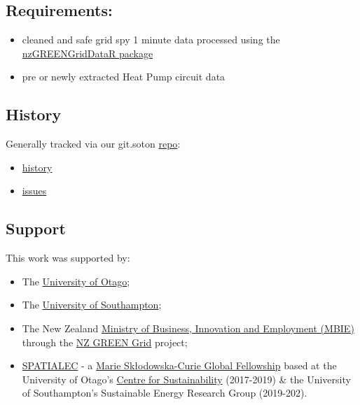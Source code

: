 \documentclass[]{article}
\providecommand{\tightlist}{%
  \setlength{\itemsep}{0pt}\setlength{\parskip}{0pt}}
\begin{document}
\subsection{Requirements:}\label{requirements}

\begin{itemize}
\tightlist
\item
  cleaned and safe grid spy 1 minute data processed using the
  \href{https://github.com/dataknut/nzGREENGridDataR/tree/master/dataProcessing/gridSpy}{nzGREENGridDataR
  package}
\item
  pre or newly extracted Heat Pump circuit data
\end{itemize}

\subsection{History}\label{history}

Generally tracked via our git.soton
\href{https://git.soton.ac.uk/ba1e12/nzGREENGrid}{repo}:

\begin{itemize}
\tightlist
\item
  \href{https://git.soton.ac.uk/ba1e12/nzGREENGrid/tree/master/analysis/profiles}{history}
\item
  \href{https://git.soton.ac.uk/ba1e12/nzGREENGrid/issues}{issues}
\end{itemize}

\subsection{Support}\label{support}

This work was supported by:

\begin{itemize}
\tightlist
\item
  The \href{https://www.otago.ac.nz/}{University of Otago};
\item
  The \href{https://www.southampton.ac.uk/}{University of Southampton};
\item
  The New Zealand \href{http://www.mbie.govt.nz/}{Ministry of Business,
  Innovation and Employment (MBIE)} through the
  \href{https://www.otago.ac.nz/centre-sustainability/research/energy/otago050285.html}{NZ
  GREEN Grid} project;
\item
  \href{http://www.energy.soton.ac.uk/tag/spatialec/}{SPATIALEC} - a
  \href{http://ec.europa.eu/research/mariecurieactions/about-msca/actions/if/index_en.htm}{Marie
  Skłodowska-Curie Global Fellowship} based at the University of Otago's
  \href{http://www.otago.ac.nz/centre-sustainability/staff/otago673896.html}{Centre
  for Sustainability} (2017-2019) \& the University of Southampton's
  Sustainable Energy Research Group (2019-202).
\end{itemize}
\end{document}

